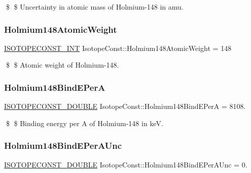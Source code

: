 \$ \$ Uncertainty in atomic mass of Holmium-\/148 in amu. \mbox{\label{group___isotope_const-_holmium-_ho148_ga64971178b53f6d4a724e5cf0f8ddbdcd}} 
\subsubsection{\texorpdfstring{Holmium148\+Atomic\+Weight}{Holmium148AtomicWeight}}
{\footnotesize\ttfamily \mbox{\hyperlink{group___isotope_const-_macros_ga5f18360b3e99483a35c32d789e62621c}{I\+S\+O\+T\+O\+P\+E\+C\+O\+N\+S\+T\+\_\+\+I\+NT}} Isotope\+Const\+::\+Holmium148\+Atomic\+Weight = 148}

\$ \$ Atomic weight of Holmium-\/148. \mbox{\label{group___isotope_const-_holmium-_ho148_gac4088806ee669b7f5dd4f450f3ebb504}} 
\subsubsection{\texorpdfstring{Holmium148\+Bind\+E\+PerA}{Holmium148BindEPerA}}
{\footnotesize\ttfamily \mbox{\hyperlink{group___isotope_const-_macros_ga8f45a7272ce02c0b4c65c44636ed719a}{I\+S\+O\+T\+O\+P\+E\+C\+O\+N\+S\+T\+\_\+\+D\+O\+U\+B\+LE}} Isotope\+Const\+::\+Holmium148\+Bind\+E\+PerA = 8108.}

\$ \$ Binding energy per A of Holmium-\/148 in keV. \mbox{\label{group___isotope_const-_holmium-_ho148_ga84ea0030a912ff551640ecc1c3e9bda0}} 
\subsubsection{\texorpdfstring{Holmium148\+Bind\+E\+Per\+A\+Unc}{Holmium148BindEPerAUnc}}
{\footnotesize\ttfamily \mbox{\hyperlink{group___isotope_const-_macros_ga8f45a7272ce02c0b4c65c44636ed719a}{I\+S\+O\+T\+O\+P\+E\+C\+O\+N\+S\+T\+\_\+\+D\+O\+U\+B\+LE}} Isotope\+Const\+::\+Holmium148\+Bind\+E\+Per\+A\+Unc = 0.}

